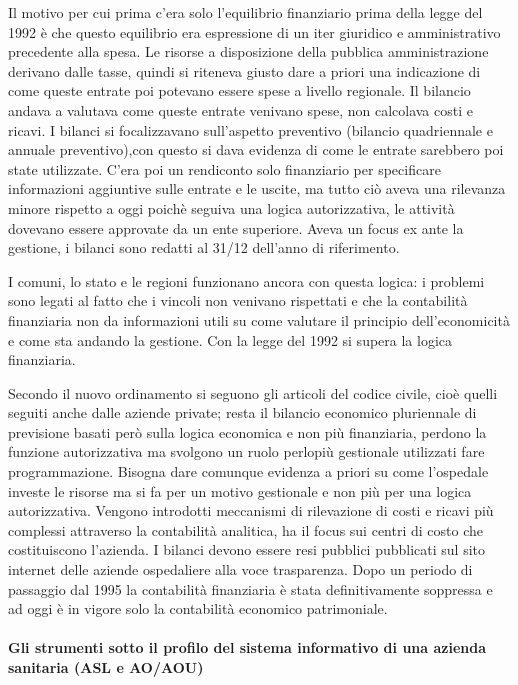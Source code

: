 Il motivo per cui prima c'era solo l'equilibrio finanziario prima della
legge del 1992 è che questo equilibrio era espressione di un iter
giuridico e amministrativo precedente alla spesa. Le risorse a
disposizione della pubblica amministrazione derivano dalle tasse, quindi
si riteneva giusto dare a priori una indicazione di come queste entrate
poi potevano essere spese a livello regionale. Il bilancio andava a
valutava come queste entrate venivano spese, non calcolava costi e
ricavi. I bilanci si focalizzavano sull'aspetto preventivo (bilancio
quadriennale e annuale preventivo),con questo si dava evidenza di come
le entrate sarebbero poi state utilizzate. C'era poi un rendiconto solo
finanziario per specificare informazioni aggiuntive sulle entrate e le
uscite, ma tutto ciò aveva una rilevanza minore rispetto a oggi poichè
seguiva una logica autorizzativa, le attività dovevano essere approvate
da un ente superiore. Aveva un focus ex ante la gestione, i bilanci sono
redatti al 31/12 dell'anno di riferimento.

I comuni, lo stato e le regioni funzionano ancora con questa logica: i
problemi sono legati al fatto che i vincoli non venivano rispettati e
che la contabilità finanziaria non da informazioni utili su come
valutare il principio dell'economicità e come sta andando la gestione.
Con la legge del 1992 si supera la logica finanziaria.

Secondo il nuovo ordinamento si seguono gli articoli del codice civile,
cioè quelli seguiti anche dalle aziende private; resta il bilancio
economico pluriennale di previsione basati però sulla logica economica e
non più finanziaria, perdono la funzione autorizzativa ma svolgono un
ruolo perlopiù gestionale utilizzati fare programmazione. Bisogna dare
comunque evidenza a priori su come l'ospedale investe le risorse ma si
fa per un motivo gestionale e non più per una logica autorizzativa.
Vengono introdotti meccanismi di rilevazione di costi e ricavi più
complessi attraverso la contabilità analitica, ha il focus sui centri di
costo che costituiscono l'azienda. I bilanci devono essere resi pubblici
pubblicati sul sito internet delle aziende ospedaliere alla voce
trasparenza. Dopo un periodo di passaggio dal 1995 la contabilità
finanziaria è stata definitivamente soppressa e ad oggi è in vigore solo
la contabilità economico patrimoniale.

\paragraph{Gli strumenti sotto il profilo del sistema informativo di una azienda sanitaria (ASL e AO/AOU)}

